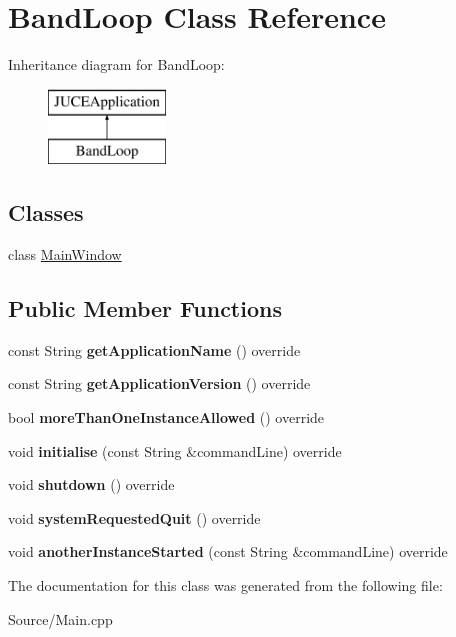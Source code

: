 \hypertarget{class_band_loop}{}\section{Band\+Loop Class Reference}
\label{class_band_loop}
Inheritance diagram for Band\+Loop\+:\begin{figure}[H]
\begin{center}
\leavevmode
\includegraphics[height=2.000000cm]{class_band_loop}
\end{center}
\end{figure}
\subsection*{Classes}
\begin{DoxyCompactItemize}
\item 
class \mbox{\hyperlink{class_band_loop_1_1_main_window}{Main\+Window}}
\end{DoxyCompactItemize}
\subsection*{Public Member Functions}
\begin{DoxyCompactItemize}
\item 
\mbox{\label{class_band_loop_a646578fbd33e32e9747f5a751cd7daa8}} 
const String {\bfseries get\+Application\+Name} () override
\item 
\mbox{\label{class_band_loop_a654032450c178987d22c9bf6a4127821}} 
const String {\bfseries get\+Application\+Version} () override
\item 
\mbox{\label{class_band_loop_a5738cf4f1092e586dd72f5e1301565bd}} 
bool {\bfseries more\+Than\+One\+Instance\+Allowed} () override
\item 
\mbox{\label{class_band_loop_acb9ef69215a5d718ebc0d9d49cb81dc6}} 
void {\bfseries initialise} (const String \&command\+Line) override
\item 
\mbox{\label{class_band_loop_aa5d05cafd9aaa354c1df4fe24319b990}} 
void {\bfseries shutdown} () override
\item 
\mbox{\label{class_band_loop_a1590f0d01379694a74887505b3ccaf8b}} 
void {\bfseries system\+Requested\+Quit} () override
\item 
\mbox{\label{class_band_loop_aafc947ed759959f1e9a04bd246f1248e}} 
void {\bfseries another\+Instance\+Started} (const String \&command\+Line) override
\end{DoxyCompactItemize}


The documentation for this class was generated from the following file\+:\begin{DoxyCompactItemize}
\item 
Source/Main.\+cpp\end{DoxyCompactItemize}
